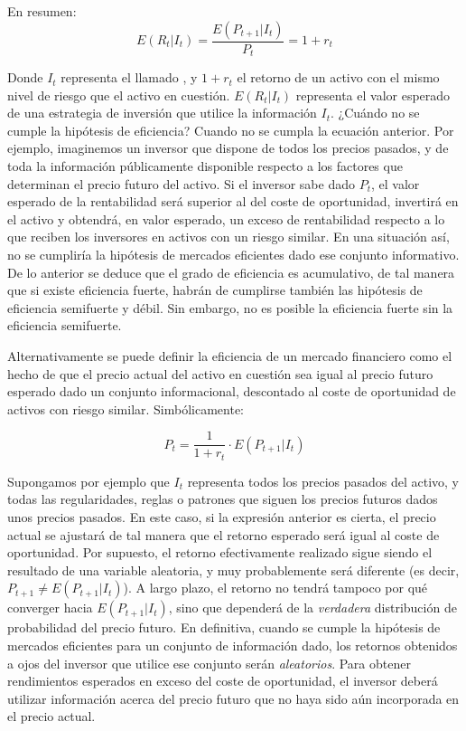 \documentclass{nuevotema}
\begin{document}
En resumen:
\begin{equation}
    E(R_t | I_t ) = \frac{E(P_{t+1} | I_t)}{P_t}= 1 + r_t
\end{equation}

Donde $I_t$ representa el llamado , y $1+r_t$ el retorno de un activo con el mismo nivel de riesgo que el activo en cuestión. $E(R_t | I_t)$ representa el valor esperado de una estrategia de inversión que utilice la información $I_t$. ¿Cuándo no se cumple la hipótesis de eficiencia? Cuando no se cumpla la ecuación anterior. Por ejemplo, imaginemos un inversor que dispone de todos los precios pasados, y de toda la información públicamente disponible respecto a los factores que determinan el precio futuro del activo. Si el inversor sabe dado $P_t$, el valor esperado de la rentabilidad será superior al del coste de oportunidad, invertirá en el activo y obtendrá, en valor esperado, un exceso de rentabilidad respecto a lo que reciben los inversores en activos con un riesgo similar. En una situación así, no se cumpliría la hipótesis de mercados eficientes dado ese conjunto informativo. De lo anterior se deduce que el grado de eficiencia es acumulativo, de tal manera que si existe eficiencia fuerte, habrán de cumplirse también las hipótesis de eficiencia semifuerte y débil. Sin embargo, no es posible la eficiencia fuerte sin la eficiencia semifuerte.

Alternativamente se puede definir la eficiencia de un mercado financiero como el hecho de que el precio actual del activo en cuestión sea igual al precio futuro esperado dado un conjunto informacional, descontado al coste de oportunidad de activos con riesgo similar. Simbólicamente:

\begin{equation}
    P_t = \frac{1}{1+r_t} \cdot E \left( P_{t+1} | I_t \right)
\end{equation}

Supongamos por ejemplo que $I_t$ representa todos los precios pasados del activo, y todas las regularidades, reglas o patrones que siguen los precios futuros dados unos precios pasados. En este caso, si la expresión anterior es cierta, el precio actual se ajustará de tal manera que el retorno esperado será igual al coste de oportunidad. Por supuesto, el retorno efectivamente realizado sigue siendo el resultado de una variable aleatoria, y muy probablemente será diferente (es decir, $P_{t+1} \neq E(P_{t+1}|I_t)$). A largo plazo, el retorno no tendrá tampoco por qué converger hacia $E (P_{t+1}|I_t)$, sino que dependerá de la \textit{verdadera} distribución de probabilidad del precio futuro. En definitiva, cuando se cumple la hipótesis de mercados eficientes para un conjunto de información dado, los retornos obtenidos a ojos del inversor que utilice ese conjunto serán \textit{aleatorios}. Para obtener rendimientos esperados en exceso del coste de oportunidad, el inversor deberá utilizar información acerca del precio futuro que no haya sido aún incorporada en el precio actual.
\end{document}
